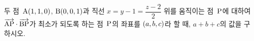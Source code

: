 두 점~$\mathrm{A}(1{,}\mkern3mu\mathopen{}1{,}\mkern3mu\mathopen{}0)$, $\mathrm{B}(0{,}\mkern3mu\mathopen{}0{,}\mkern3mu\mathopen{}1)$과 직선 $x=y-1=\dfrac{z-2}{2}$ 위를 움직이는 점~$\mathrm{P}$에 대하여 $\overrightarrow{\mathrm{AP}}\cdot\overrightarrow{\mathrm{BP}}$가 최소가 되도록 하는 점~$\mathrm{P}$의 좌표를 $(a{,}\mkern3mu\mathopen{}b{,}\mkern3mu\mathopen{}c)$라 할 때, $a+b+c$의 값을 구하시오.
